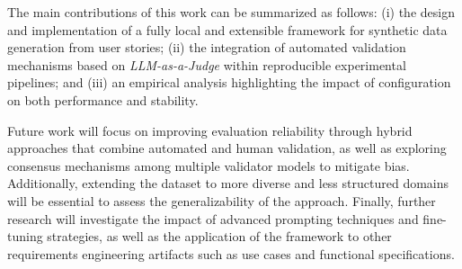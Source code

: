 \documentclass[pdflatex,sn-mathphys-num]{sn-jnl}%
\theoremstyle{thmstyleone}%
\theoremstyle{thmstyletwo}%
\theoremstyle{thmstylethree}%
\begin{document}
The main contributions of this work can be summarized as follows: (i) the design and implementation of a fully local and extensible framework for synthetic data generation from user stories; (ii) the integration of automated validation mechanisms based on \textit{LLM-as-a-Judge} within reproducible experimental pipelines; and (iii) an empirical analysis highlighting the impact of configuration on both performance and stability.

Future work will focus on improving evaluation reliability through hybrid approaches that combine automated and human validation, as well as exploring consensus mechanisms among multiple validator models to mitigate bias. Additionally, extending the dataset to more diverse and less structured domains will be essential to assess the generalizability of the approach. Finally, further research will investigate the impact of advanced prompting techniques and fine-tuning strategies, as well as the application of the framework to other requirements engineering artifacts such as use cases and functional specifications.

\backmatter
\end{document}
